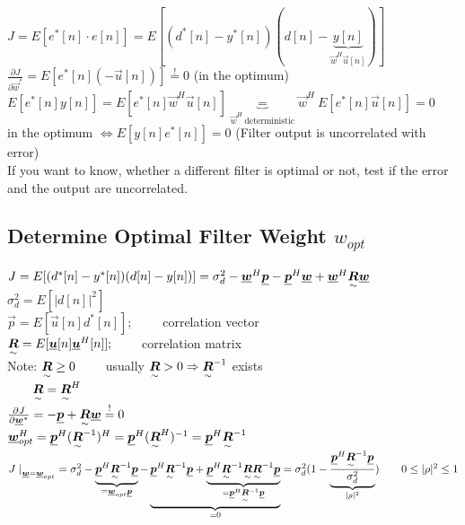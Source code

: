 \begin{doublespace}

$J=E[e^*[n]\cdot e[n]] = E[(d^*[n] - y^*[n])(d[n]-\underbrace{y[n]}_{\vec{w}^H\vec{u}[n]})]$\\
$\frac{\partial J}{\partial \vec{w}^*} = E[e^*[n](-\vec{u}[n])] \stackrel{!}{=} 0$ (in the optimum)\\
$E[e^*[n]y[n]] = E[e^*[n]\vec{w}^H\vec{u}[n]] \underbrace{=}_{\vec{w}^H\ \text{deterministic}} \vec{w}^H\ E[e^*[n]\vec{u}[n]]=0$\\
in the optimum $\Leftrightarrow E[y[n]e^*[n]] = 0$ (Filter output is uncorrelated with error)\\
If you want to know, whether  a different filter is optimal or not, test if the error and the output are uncorrelated.

\subsection{Determine Optimal Filter Weight \texorpdfstring{$w_{opt}$}{w-opt}}
$J=E[(d^*[n] - y^*[n])(d[n]-y[n])] = \sigma_d^2 - \vec{w}^H\vec{p} - \vec{p}^H \vec{w} + \vec{w}^H \ma{R}\vec{w}$\\
$\sigma_d^2 = E[|d[n]|^2]$\\
$\vec{p} = E[\vec{u}[n]d^*[n]]; \qquad$ correlation vector\\
$\ma{R} = E[\vec{u}[n]\vec{u}^H[n]]; \qquad$ correlation matrix\\
Note: $\ma{R}\geq 0 \qquad$ usually $\ma{R}>0 \Rightarrow \ma{R}^{-1}$ exists\\$\qquad \ma{R}=\ma{R}^H$\\
$\frac{\partial J}{\partial \vec{w}^*}=-\vec{p} + \ma{R}\vec{w} \stackrel{!}{=} 0$\\
$\vec{w}^H_{opt} = \vec{p}^H(\ma{R}^{-1})^H = \vec{p}^H(\ma{R}^{H})^{-1} = \vec{p}^H\ma{R}^{-1}$\\
$J\left.\right|_{\vec{w}=\vec{w}_{opt}}= \sigma_d^2 - \underbrace{\vec{p}^H\ma{R}^{-1}\vec{p}}_{=\vec{w}_{opt}\vec{p}} - \underbrace{\vec{p}^H\ma{R}^{-1}\vec{p} + \underbrace{\vec{p}^H\ma{R}^{-1}\ma{R}\ma{R}^{-1}\vec{p}}_{=\vec{p}^H\ma{R}^{-1}\vec{p}}}_{=0} = \sigma_d^2(1-\underbrace{\frac{\vec{p}^H\ma{R}^{-1}\vec{p}}{\sigma_d^2}}_{|\rho|^2}) \qquad 0\leq|\rho|^2\leq 1$
\end{doublespace}

